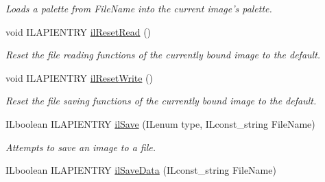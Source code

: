 \begin{DoxyCompactItemize}
\begin{DoxyCompactList}\small\item\em Loads a palette from File\-Name into the current image's palette. \end{DoxyCompactList}\item 
\hypertarget{group__file_gaad6da45dcc526f0b4d05c488c504b77b}{void I\-L\-A\-P\-I\-E\-N\-T\-R\-Y \hyperlink{group__file_gaad6da45dcc526f0b4d05c488c504b77b}{il\-Reset\-Read} ()}\label{group__file_gaad6da45dcc526f0b4d05c488c504b77b}

\begin{DoxyCompactList}\small\item\em Reset the file reading functions of the currently bound image to the default. \end{DoxyCompactList}\item 
\hypertarget{group__file_gac1f4f4a66b6ff3ae5a986b24cf2cd626}{void I\-L\-A\-P\-I\-E\-N\-T\-R\-Y \hyperlink{group__file_gac1f4f4a66b6ff3ae5a986b24cf2cd626}{il\-Reset\-Write} ()}\label{group__file_gac1f4f4a66b6ff3ae5a986b24cf2cd626}

\begin{DoxyCompactList}\small\item\em Reset the file saving functions of the currently bound image to the default. \end{DoxyCompactList}\item 
I\-Lboolean I\-L\-A\-P\-I\-E\-N\-T\-R\-Y \hyperlink{group__file_ga9defa198f10b426a91f1b764f0dc4a08}{il\-Save} (I\-Lenum type, I\-Lconst\-\_\-string File\-Name)
\begin{DoxyCompactList}\small\item\em Attempts to save an image to a file. \end{DoxyCompactList}\item 
\hypertarget{group__file_gabae3fa5c553904bd5ff5c7e6abc6b2c4}{I\-Lboolean I\-L\-A\-P\-I\-E\-N\-T\-R\-Y \hyperlink{group__file_gabae3fa5c553904bd5ff5c7e6abc6b2c4}{il\-Save\-Data} (I\-Lconst\-\_\-string File\-Name)}\label{group__file_gabae3fa5c553904bd5ff5c7e6abc6b2c4}


\end{DoxyCompactItemize}

